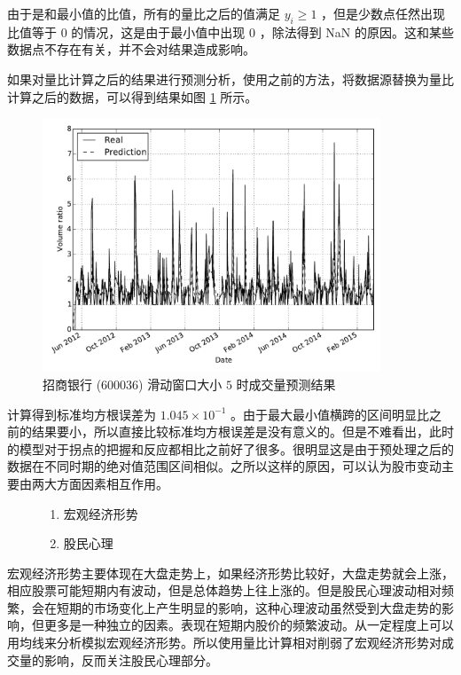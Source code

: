 由于是和最小值的比值，所有的量比之后的值满足 $y_{i}\geq 1$ ，但是少数点任然出现比值等于 $0$ 的情况，这是由于最小值中出现 $0$ ，除法得到 NaN 的原因。这和某些数据点不存在有关，并不会对结果造成影响。

如果对量比计算之后的结果进行预测分析，使用之前的方法，将数据源替换为量比计算之后的数据，可以得到结果如图 \ref{sliding_window:1} 所示。

\begin{figure}
  \centering
  \includegraphics[width=0.9\textwidth]{plots/sliding_ratio_forecast.pdf}
  \caption{招商银行 (600036) 滑动窗口大小 $5$ 时成交量预测结果}
  \label{sliding_window:1}
\end{figure}

计算得到标准均方根误差为 $1.045\times 10^{-1}$ 。由于最大最小值横跨的区间明显比之前的结果要小，所以直接比较标准均方根误差是没有意义的。但是不难看出，此时的模型对于拐点的把握和反应都相比之前好了很多。很明显这是由于预处理之后的数据在不同时期的绝对值范围区间相似。之所以这样的原因，可以认为股市变动主要由两大方面因素相互作用。

\begin{figure}[H]
  \begin{minipage}{\textwidth}
    \begin{enumerate}
      \item 宏观经济形势
      \item 股民心理
    \end{enumerate}
  \end{minipage}
\end{figure}

宏观经济形势主要体现在大盘走势上，如果经济形势比较好，大盘走势就会上涨，相应股票可能短期内有波动，但是总体趋势上往上涨的。但是股民心理波动相对频繁，会在短期的市场变化上产生明显的影响，这种心理波动虽然受到大盘走势的影响，但更多是一种独立的因素。表现在短期内股价的频繁波动。从一定程度上可以用均线来分析模拟宏观经济形势。所以使用量比计算相对削弱了宏观经济形势对成交量的影响，反而关注股民心理部分。

